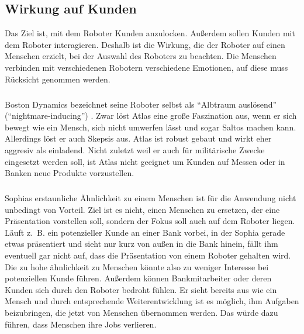 
\subsection{Wirkung auf Kunden}
Das Ziel ist, mit dem Roboter Kunden anzulocken. Außerdem sollen Kunden mit dem
Roboter interagieren. Deshalb ist die Wirkung, die der Roboter auf einen
Menschen erzielt, bei der Auswahl des Roboters zu beachten. 
Die Menschen verbinden mit verschiedenen Robotern verschiedene Emotionen, auf
diese muss Rücksicht genommen werden.

\subparagraph{}
Boston Dynamics bezeichnet seine Roboter selbst als "`Albtraum auslösend"'
("`night\-mare-\-in\-du\-cing"') \cite{Guardian2018}. Zwar löst Atlas eine große
Faszination aus, wenn er sich bewegt wie ein Mensch, sich nicht umwerfen lässt
und sogar Saltos machen kann. Allerdings löst er auch Skepsis aus. Atlas ist
robust gebaut und wirkt eher aggresiv als einladend. Nicht zuletzt weil er auch
für militärische Zwecke eingesetzt werden soll, ist Atlas nicht geeignet um
Kunden auf Messen oder in Banken neue Produkte vorzustellen.

\subparagraph{}
Sophias erstaunliche Ähnlichkeit zu einem Menschen ist für die Anwendung nicht
unbedingt von Vorteil. Ziel ist es nicht, einen Menschen zu ersetzen, der eine
Präsentation vorstellen soll, sondern der Fokus soll auch auf dem Roboter
liegen. Läuft z.~B. ein potenzieller Kunde an einer Bank vorbei, in der Sophia
gerade etwas präsentiert und sieht nur kurz von außen in die Bank hinein, fällt
ihm eventuell gar nicht auf, dass die Präsentation von einem Roboter gehalten
wird. Die zu hohe ähnlichkeit zu Menschen könnte also zu weniger Interesse bei
potenziellen Kunde führen. Außerdem können Bankmitarbeiter oder deren Kunden
sich durch den Roboter bedroht fühlen. Er sieht bereits aus wie ein Mensch und
durch entsprechende Weiterentwicklung ist es möglich, ihm Aufgaben beizubringen,
die jetzt von Menschen übernommen werden. Das würde dazu führen, dass Menschen
ihre Jobs verlieren.

